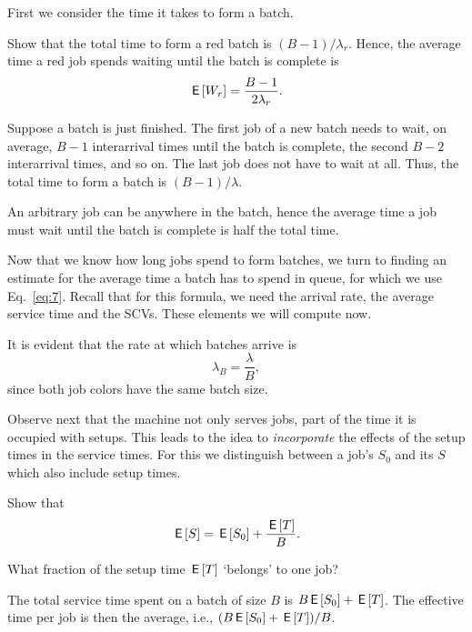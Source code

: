 First we consider the time it takes to form a batch. 
\begin{exercise}
  Show that the total time to form a red batch is $(B-1)/\lambda_r$. Hence, the average time a red job spends waiting until the batch is complete is
\begin{equation*}
  \,\mathsf{E}\left[W_r\right] = \frac{B-1}{2\lambda_r}.
\end{equation*}
\begin{solution}
  Suppose a batch is just finished. The first job of a new batch needs to wait, on average, $B-1$  interarrival times until the batch is complete, the second $B-2$ interarrival times, and so on. The last job does not have to wait at all. Thus, the total time to form a batch is $(B-1)/\lambda$. 

An arbitrary job can be anywhere in the batch, hence the average time a job must wait until the batch is complete is half the total time. 
\end{solution}
\end{exercise}

Now that we know how long jobs spend to form batches, we turn to finding an estimate for the average time a batch has to spend in queue, for which we use Eq.~\eqref{eq:7}. Recall that for  this formula, we need the arrival rate, the average service time and the SCVs. These elements we will compute now. 

It is evident that the  rate at which batches arrive is 
\begin{equation*}
  \lambda_B = \frac \lambda B,
\end{equation*}
since both job colors have the same batch size.  

Observe next that the machine not only  serves jobs, part of the time it is  occupied with setups. This leads to the idea to  \emph{incorporate} the effects of the setup times in the service times. For this we distinguish between a job's  $S_0$  and its  $S$ which also include setup times. 

\begin{exercise}
  Show that
  \begin{equation*}
    \,\mathsf{E}\left[S\right] = \,\mathsf{E}\left[S_0\right] + \frac{\,\mathsf{E}\left[T\right]} B.
  \end{equation*}
  \begin{hint}
    What fraction of the setup time $\,\mathsf{E}\left[T\right]$ `belongs' to one job?
  \end{hint}
  \begin{solution}
    The total service time spent on a batch of size $B$ is $B \,\mathsf{E}\left[S_0\right] + \,\mathsf{E}\left[T\right]$. The effective time per job is then the average, i.e.,  $(B \,\mathsf{E}\left[S_0\right]+\,\mathsf{E}\left[T\right])/B$. 
  \end{solution}
\end{exercise}


